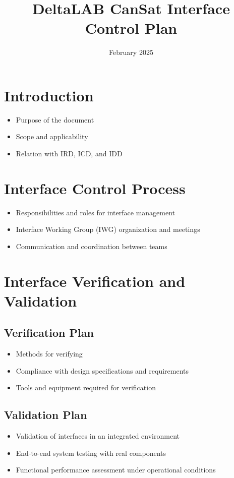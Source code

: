 \documentclass{article}
\title{DeltaLAB CanSat Interface Control Plan}
\author{}
\date{February 2025}
\begin{document}
\maketitle
\section{Introduction}

\begin{itemize}
    \item Purpose of the document
    \item Scope and applicability
    \item Relation with IRD, ICD, and IDD
\end{itemize}

\section{Interface Control Process}

\begin{itemize}
    \item Responsibilities and roles for interface management
    \item Interface Working Group (IWG) organization and meetings
    \item Communication and coordination between teams
\end{itemize}

\section{Interface Verification and Validation}

\subsection{Verification Plan}
\begin{itemize}
    \item Methods for verifying
    \item Compliance with design specifications and requirements
    \item Tools and equipment required for verification
\end{itemize}

\subsection{Validation Plan}
\begin{itemize}
    \item Validation of interfaces in an integrated environment
    \item End-to-end system testing with real components
    \item Functional performance assessment under operational conditions
\end{itemize}
\end{document}

